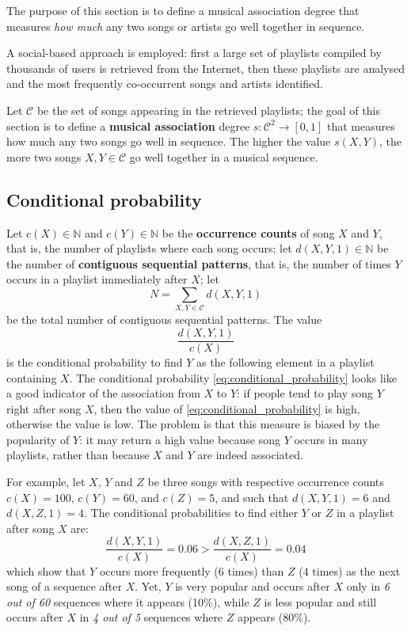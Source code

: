 The purpose of this section is to define a musical association degree that measures \emph{how much} any two songs or artists go well together in sequence.

A social-based approach is employed: first a large set of playlists compiled by thousands of users is retrieved from the Internet, then these playlists are analysed and the most frequently co-occurrent songs and artists identified.

Let $\mathcal{C}$ be the set of songs appearing in the retrieved playlists; the goal of this section is to define a \textbf{musical association} degree $s: \mathcal{C}^2 \to [0,1]$ that measures how much any two songs go well in sequence. The higher the value $s(X,Y)$, the more two songs $X, Y \in \mathcal{C}$ go well together in a musical sequence.

\subsection{Conditional probability} %
\label{sub:conditional_probability}

Let $c(X) \in \mathbb{N}$ and $c(Y) \in \mathbb{N}$ be the \textbf{occurrence counts} of song $X$ and $Y$, that is, the number of playlists where each song occurs;
let $d(X,Y,1) \in \mathbb{N}$ be the number of \textbf{contiguous sequential patterns}, that is, the number of times $Y$ occurs in a playlist immediately after $X$; 
let
\begin{equation*}
        N = \sum_{X,Y \in \mathcal{C}} d(X,Y,1)
\end{equation*}
be the total number of contiguous sequential patterns.
%
The value 
\begin{equation}
    \frac{d(X,Y,1)}{c(X)}    
\label{eq:conditional_probability}
\end{equation}
is the conditional probability to find $Y$ as the following element in a playlist containing $X$.
The conditional probability \eqref{eq:conditional_probability} looks like a good indicator of the association from $X$ to $Y$: 
if people tend to play song $Y$ right after song $X$, then the value of \eqref{eq:conditional_probability} is high, otherwise the value is low.
%
The problem is that this measure is biased by the popularity of $Y$: it may return a high value because song $Y$ occurs in many playlists, rather than because $X$ and $Y$ are indeed associated.

For example, let $X$, $Y$ and $Z$ be three songs with respective occurrence counts $c(X) = 100$, $c(Y) = 60$, and $c(Z) = 5$, and such that $d(X,Y,1) = 6$ and $d(X,Z,1) = 4$. 
The conditional probabilities to find either $Y$ or $Z$ in a playlist after song $X$ are:
\begin{equation*}
  \frac{d(X,Y,1)}{c(X)} = 0.06 > \frac{d(X,Z,1)}{c(X)} = 0.04%
\end{equation*}
which show that $Y$ occurs more frequently (6 times) than $Z$ (4 times) as the next song of a sequence after $X$. 
Yet, $Y$ is very popular and occurs after $X$ only in \emph{6 out of 60} sequences where it appears (10\%), 
while $Z$ is less popular and still occurs after $X$ in \emph{4 out of 5} sequences where $Z$ appears (80\%).


